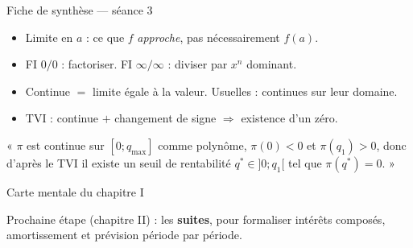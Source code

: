 \documentclass[10pt,aspectratio=169]{beamer}
\numberwithin{dummy}{section}
\newcommand{\Prof}{\pi}
\begin{document}
\begin{frame}{Fiche de synthèse --- séance 3}
\begin{boxsynthese}
\begin{itemize}
    \item Limite en $a$ : ce que $f$ \emph{approche}, pas nécessairement $f(a)$.
    \item FI $0/0$ : factoriser. FI $\infty/\infty$ : diviser par $x^n$ dominant.
    \item Continue $=$ limite égale à la valeur. Usuelles : continues sur leur domaine.
    \item TVI : continue $+$ changement de signe $\Rightarrow$ existence d'un zéro.
\end{itemize}
\end{boxsynthese}

\vspace{0.3em}
\begin{boxgestion}
« $\Prof$ est continue sur $[0;q_{\max}]$ comme polynôme,
$\Prof(0)<0$ et $\Prof(q_1)>0$, donc d'après le TVI il existe un seuil de rentabilité
$q^*\in]0;q_1[$ tel que $\Prof(q^*)=0$. »
\end{boxgestion}
\end{frame}

\begin{frame}{Carte mentale du chapitre I}
\centering
{}

\vspace{0.5em}
{\small Prochaine étape (chapitre II) : les \textbf{suites}, pour formaliser
intérêts composés, amortissement et prévision période par période.}
\end{frame}
\end{document}
